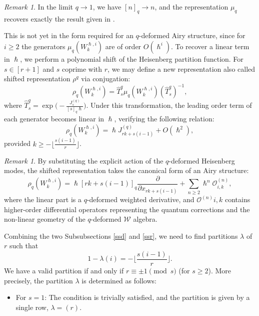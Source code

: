 \documentclass[reqno,11pt]{amsart}
\theoremstyle{plain}
\theoremstyle{definition}
\theoremstyle{remark}
\newtheorem{remark}[theorem]{Remark}
\numberwithin{equation}{section}
\newcommand{\1}{\mathds{1}}
\newcommand{\2}{\frac{1}{2}}
\begin{document}
{				\begin{remark}
					In the limit $q \rightarrow 1$, we have $[n]_q \rightarrow n$, and the representation $\mu_q$ recovers exactly the result given in  {\cite[Proposition~4.5 \& Corollary~4.7]{BBCCN18}}.
				\end{remark}
				This is not yet in the form required for an $q$-deformed Airy structure, since for $i \geq 2$ the generators $\mu_{q}( W^{\hslash,i}_k)$ are of order $O(\hslash^i)$. To recover a linear term in $\hslash$, we perform a polynomial shift of the Heisenberg partition function.
				For $ s \in [r+1]$ and $s$ coprime with $r$,
				we may define a new representation also called shifted representation $\rho^q$ via conjugation:
				\begin{equation}\label{eq:rep}
					\rho_q( W^{\hslash,i}_k) = \hat{T}^q_s \mu_q(W^{\hslash,i}_k) (\hat{T}^q_s)^{-1}, 
				\end{equation}
				where $\hat{T}^q_s = \exp \Big( -\frac{J^{(q)}_s}{[s]_q\hslash} \Big).$ Under this transformation, the leading order term of each generator becomes linear in $\hslash$, verifying the following relation: 
				\begin{equation}
					\rho_q( W^{\hslash,i}_k) = \hslash J^{(q)}_{r k + s (i-1)} + O(\hslash^2),
				\end{equation}
				provided $k  \geq - \lfloor \frac{s(i-1)}{r} \rfloor $.
				\begin{remark}
					By substituting the explicit action of the $q$-deformed Heisenberg modes, the shifted representation takes the canonical form of an Airy structure:
					\begin{equation}
						\rho_q( W^{\hslash,i}_k) = \hslash [rk + s(i-1)]_q \frac{\partial}{\partial x_{rk + s(i-1)}} + \sum_{n \geq 2} \hslash^n \mathcal{O}^{(n)}_{i,k},
					\end{equation}
					where the linear part is a $q$-deformed weighted derivative, and $\mathcal{O}^{(n)}{i,k}$ contains higher-order differential operators representing the quantum corrections and the non-linear geometry of the $q$-deformed $\mathcal{W}$ algebra.
				\end{remark}
				Combining the two Subsubsections \ref{ssd} and \ref{ssr}, we need to find partitions $\lambda$ of $r$ such that $$1-\lambda(i) = - \lfloor \frac{s(i-1)}{r} \rfloor.$$ 
				We have a valid partition if and only if $r \equiv \pm 1 \pmod{s}$ (for $s \geq 2$). More precisely, the partition $\lambda$ is determined as follows:
				\begin{itemize}
					\item {For $s=1$:} The condition is trivially satisfied, and the partition is given by a single row, $\lambda = (r)$.

\end{itemize}}
\end{document}
